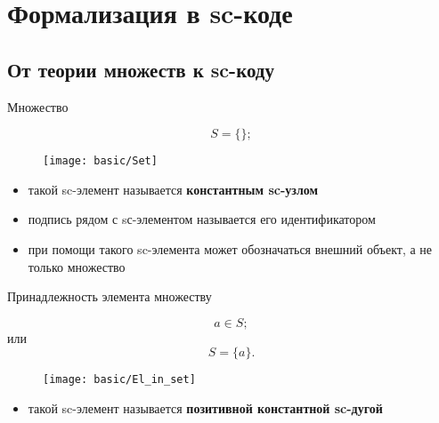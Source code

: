 % 
% 
%
% 
% 

\section{Формализация в sc-коде}

\subsection{От теории множеств к sc-коду}

\begin{frame}{Множество}
  \begin{center}
    \[ S = \{ \}; \]

    \objeqv  

    \begin{figure}
      \texttt{[image: basic/Set]}
    \end{figure}
  \end{center}

  \begin{itemize}
  \item такой sc-элемент называется \textbf{константным sc-узлом}
  \item подпись рядом с sс-элементом называется его идентификатором
  \item при помощи такого sc-элемента может обозначаться внешний
    объект, а не только множество
  \end{itemize}
\end{frame}

\begin{frame}{Принадлежность элемента множеству}
  \begin{center}
    \[ a \in S; \] или \[ S = \{ a \}. \]

    \objeqv  

    \begin{figure}
      \texttt{[image: basic/El\_in\_set]}
    \end{figure}
  \end{center}

  \begin{itemize}
  \item такой sc-элемент называется \textbf{позитивной константной sc-дугой}
  \end{itemize}
\end{frame}

